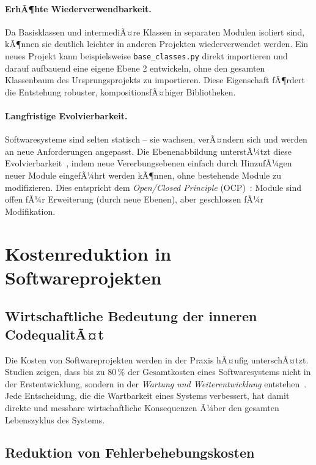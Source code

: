 ﻿\documentclass[a4paper,12pt]{article}
\begin{document}
\paragraph{ErhÃ¶hte Wiederverwendbarkeit.}
Da Basisklassen und intermediÃ¤re Klassen in separaten Modulen isoliert sind,
kÃ¶nnen sie deutlich leichter in anderen Projekten wiederverwendet werden. Ein
neues Projekt kann beispielsweise \texttt{base\_classes.py} direkt importieren
und darauf aufbauend eine eigene Ebene 2 entwickeln, ohne den gesamten
Klassenbaum des Ursprungsprojekts zu importieren. Diese Eigenschaft fÃ¶rdert
die Entstehung robuster, kompositionsfÃ¤higer Bibliotheken.

\paragraph{Langfristige Evolvierbarkeit.}
Softwaresysteme sind selten statisch -- sie wachsen, verÃ¤ndern sich und
werden an neue Anforderungen angepasst. Die Ebenenabbildung unterstÃ¼tzt diese
Evolvierbarkeit~\cite{lehman1997}, indem neue Vererbungsebenen einfach durch
HinzufÃ¼gen neuer Module eingefÃ¼hrt werden kÃ¶nnen, ohne bestehende Module zu
modifizieren. Dies entspricht dem \textit{Open/Closed Principle}
(OCP)~\cite{martin2017}: Module sind offen fÃ¼r Erweiterung (durch neue Ebenen),
aber geschlossen fÃ¼r Modifikation.

\section{Kostenreduktion in Softwareprojekten}

\subsection{Wirtschaftliche Bedeutung der inneren CodequalitÃ¤t}

Die Kosten von Softwareprojekten werden in der Praxis hÃ¤ufig unterschÃ¤tzt.
Studien zeigen, dass bis zu 80\,\% der Gesamtkosten eines Softwaresystems nicht
in der Erstentwicklung, sondern in der \textit{Wartung und Weiterentwicklung}
entstehen~\cite{pressman2014}. Jede Entscheidung, die die Wartbarkeit eines
Systems verbessert, hat damit direkte und messbare wirtschaftliche Konsequenzen
Ã¼ber den gesamten Lebenszyklus des Systems.

\subsection{Reduktion von Fehlerbehebungskosten}
\end{document}
